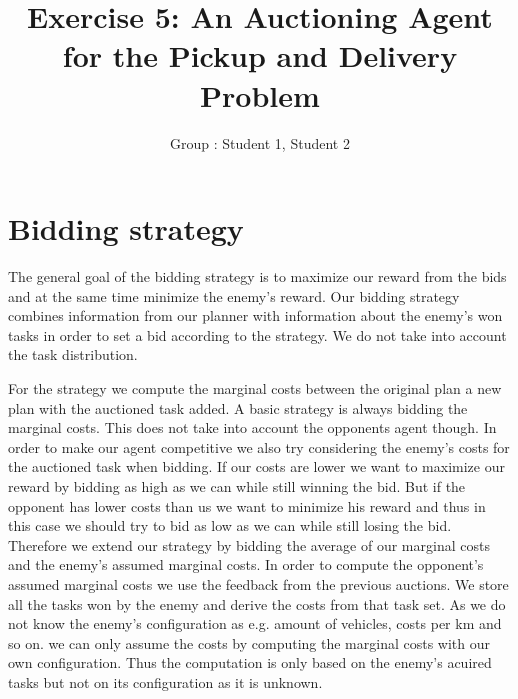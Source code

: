 \documentclass[11pt]{article}
\title{\bf Exercise 5: An Auctioning Agent for the Pickup and Delivery Problem}
\author{Group \textnumero: Student 1, Student 2}
\begin{document}
\maketitle

\section{Bidding strategy}
The general goal of the bidding strategy is to maximize our reward from the bids and at the same time minimize the enemy's reward.
Our bidding strategy combines information from our planner with information about the enemy's won tasks in order to set a bid according to the strategy.
We do not take into account the task distribution.

For the strategy we compute the marginal costs between the original plan a new plan with the auctioned task added. A basic strategy is always bidding the marginal costs. This does not take into account the opponents agent though. In order to make our agent competitive we also try considering the enemy's costs for the auctioned task when bidding. If our costs are lower we want to maximize our reward by bidding as high as we can while still winning the bid. But if the opponent has lower costs than us we want to minimize his reward and thus in this case we should try to bid as low as we can while still losing the bid. Therefore we extend our strategy by bidding the average of our marginal costs and the enemy's assumed marginal costs.
In order to compute the opponent's assumed marginal costs we use the feedback from the previous auctions. We store all the tasks won by the enemy and derive the costs from that task set. As we do not know the enemy's configuration as e.g. amount of vehicles, costs per km and so on. we can only assume the costs by computing the marginal costs with our own configuration. Thus the computation is only based on the enemy's acuired tasks but not on its configuration as it is unknown. 




\end{document}
